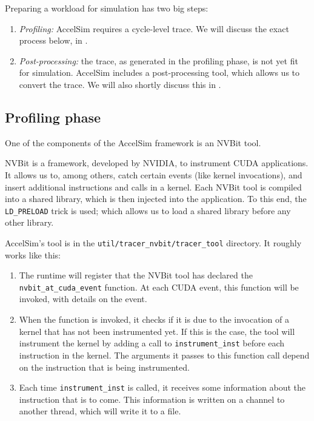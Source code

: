 Preparing a workload for simulation has two big steps:
\begin{enumerate}
    \item \textit{Profiling:} AccelSim requires a cycle-level trace.
    We will discuss the exact process below, in .
    \item \textit{Post-processing:} the trace, as generated in the profiling phase, is not yet fit for simulation.
    AccelSim includes a post-processing tool, which allows us to convert the trace.
    We will also shortly discuss this in .
\end{enumerate}

\subsection{Profiling phase}\label{subsec:profiling-phase}
One of the components of the AccelSim framework is an NVBit\cite{nvbit} tool.

NVBit is a framework, developed by NVIDIA, to instrument CUDA applications.
It allows us to, among others, catch certain events (like kernel invocations), and insert additional instructions and calls in a kernel.
Each NVBit tool is compiled into a shared library, which is then injected into the application.
To this end, the \verb|LD_PRELOAD| trick is used; which allows us to load a shared library before any other library.

AccelSim's tool is in the \verb|util/tracer_nvbit/tracer_tool| directory.
It roughly works like this:
\begin{enumerate}
    \item The runtime will register that the NVBit tool has declared the \verb|nvbit_at_cuda_event| function.
    At each CUDA event, this function will be invoked, with details on the event.
    \item When the function is invoked, it checks if it is due to the invocation of a kernel that has not been instrumented yet.
    If this is the case, the tool will instrument the kernel by adding a call to \verb|instrument_inst| before each instruction in the kernel.
    The arguments it passes to this function call depend on the instruction that is being instrumented.
    \item Each time \verb|instrument_inst| is called, it receives some information about the instruction that is to come.
    This information is written on a channel to another thread, which will write it to a file.
\end{enumerate}


